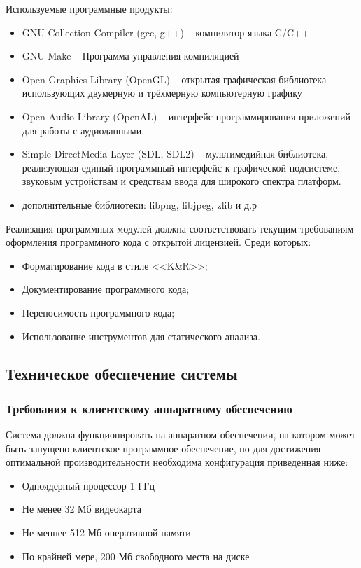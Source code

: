 Используемые программные продукты:
\begin{itemize}
    \item GNU Collection Compiler (gcc, g++) -- компилятор языка C/C++
    \item GNU Make -- Программа управления компиляцией
    \item Open Graphics Library (OpenGL) -- открытая графическая библиотека использующих двумерную 
        и трёхмерную компьютерную графику
    \item Open Audio Library (OpenAL) -- интерфейс программирования приложений для работы с аудиоданными.
    \item Simple DirectMedia Layer (SDL, SDL2) -- мультимедийная библиотека, реализующая единый 
        программный интерфейс к графической подсистеме, звуковым устройствам и средствам ввода 
        для широкого спектра платформ.
    \item дополнительные библиотеки: libpng, libjpeg, zlib и д.р
\end{itemize}

Реализация программных модулей должна соответствовать текущим требованиям оформления 
программного кода с открытой лицензией. Среди которых:
\begin{itemize}
    \item Форматирование кода в стиле <<K&R>>;
    \item Документирование программного кода;
    \item Переносимость программного кода;
    \item Использование инструментов для статического анализа.
\end{itemize}

\subsection{Техническое обеспечение системы}
\subsubsection{Требования к клиентскому аппаратному обеспечению}
Система должна функционировать на аппаратном обеспечении, на котором может быть запущено 
клиентское программное обеспечение, но для достижения оптимальной производительности 
необходима конфигурация приведенная ниже:
\begin{itemize}
    \item Одноядерный процессор 1 ГГц
    \item Не менее 32 Мб видеокарта
    \item Не меннее 512 Мб оперативной памяти
    \item По крайней мере, 200 Мб свободного места на диске
\end{itemize}

